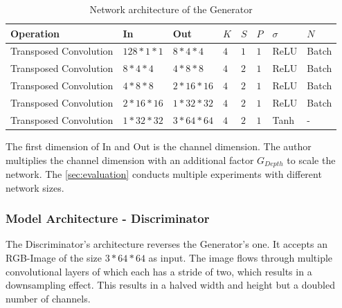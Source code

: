 \begin{table}[H]
    \centering
    \begin{tabular}{@{}llllllll@{}}
        \toprule
        Operation              & In              & Out              & $ K $ & $ S $ & $ P $ & $ \sigma $ & $ N $ \\ \midrule
        Transposed Convolution & $ 128 * 1 * 1 $ & $ 8 * 4 * 4 $    & $ 4 $ & $ 1 $ & $ 1 $ & ReLU       & Batch \\
        Transposed Convolution & $ 8 * 4 * 4 $   & $ 4 * 8 * 8 $    & $ 4 $ & $ 2 $ & $ 1 $ & ReLU       & Batch \\
        Transposed Convolution & $ 4 * 8 * 8 $   & $ 2 * 16 * 16 $  & $ 4 $ & $ 2 $ & $ 1 $ & ReLU       & Batch \\
        Transposed Convolution & $ 2 * 16 * 16 $ & $ 1 * 32 * 32 $  & $ 4 $ & $ 2 $ & $ 1 $ & ReLU       & Batch \\
        Transposed Convolution & $ 1 * 32 * 32 $ & $ 3 * 64 * 64 $  & $ 4 $ & $ 2 $ & $ 1 $ & Tanh       & -     \\ \bottomrule
    \end{tabular}
    \caption{Network architecture of the Generator}
    \label{tab:architecture-generator}
\end{table}

The first dimension of In and Out is the channel dimension. The author multiplies the channel dimension with an additional factor $ G_{Depth} $ to scale the network. The \autoref{sec:evaluation}  conducts multiple experiments with different network sizes. \\



\newpage

\subsubsection{Model Architecture - Discriminator}

The Discriminator's architecture reverses the Generator's one. It accepts an RGB-Image of the size $ 3* 64 * 64 $ as input. The image flows through multiple convolutional layers of which each has a stride of two, which results in a downsampling effect. This results in a halved width and height but a doubled number of channels. \\

